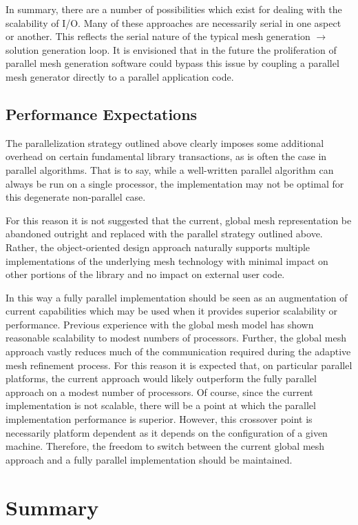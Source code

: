 In summary, there are a number of possibilities which exist for dealing with the scalability of I/O.  Many of these approaches are necessarily serial in one aspect or another.  This reflects the serial nature of the typical mesh generation $\rightarrow$ solution generation loop.  It is envisioned that in the future the proliferation of parallel mesh generation software could bypass this issue by coupling a parallel mesh generator directly to a parallel application code.

\subsection{Performance Expectations}
The parallelization strategy outlined above clearly imposes some additional overhead on certain fundamental library transactions, as is often the case in parallel algorithms.  That is to say, while a well-written parallel algorithm can always be run on a single processor, the implementation may not be optimal for this degenerate non-parallel case.

For this reason it is not suggested that the current, global mesh representation be abandoned outright and replaced with the parallel strategy outlined above.  Rather, the object-oriented design approach naturally supports multiple implementations of the underlying mesh technology with minimal impact on other portions of the library and no impact on external user code.

In this way a fully parallel implementation should be seen as an augmentation of current capabilities which may be used when it provides superior scalability or performance.  Previous experience with the global mesh model has shown reasonable scalability to modest numbers of processors.  Further, the global mesh approach vastly reduces much of the communication required during the adaptive mesh refinement process.  For this reason it is expected that, on particular parallel platforms, the current approach would likely outperform the fully parallel approach on a modest number of processors.  Of course, since the current implementation is not scalable, there will be a point at which the parallel implementation performance is superior.  However, this crossover point is necessarily platform dependent as it depends on the configuration of a given machine.  Therefore, the freedom to switch between the current global mesh approach and a fully parallel implementation should be maintained.

\section*{Summary}

